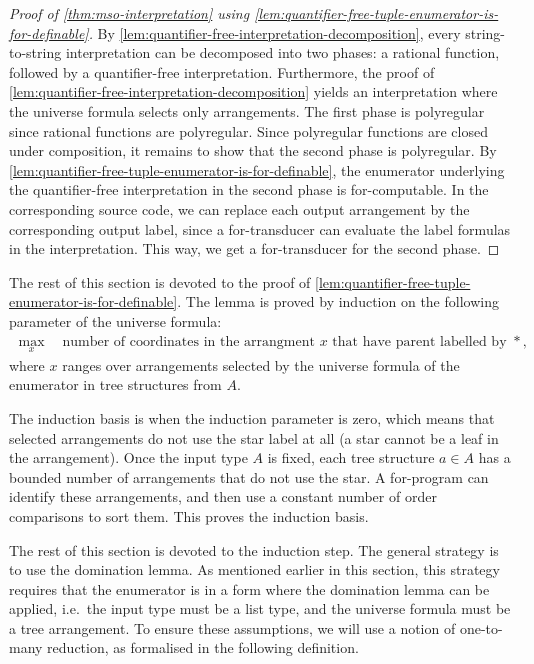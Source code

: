 \begin{proof}[Proof of \cref{thm:mso-interpretation} using \cref{lem:quantifier-free-tuple-enumerator-is-for-definable}]
By  \cref{lem:quantifier-free-interpretation-decomposition}, every string-to-string \mso interpretation can be decomposed into two phases:  a rational function, followed by  a quantifier-free interpretation. Furthermore, the proof of \cref{lem:quantifier-free-interpretation-decomposition} yields an  interpretation where the universe formula selects only arrangements. The first phase is polyregular since rational functions are polyregular. Since polyregular functions are closed under composition, it remains to show that the  second phase is polyregular. By \cref{lem:quantifier-free-tuple-enumerator-is-for-definable}, the  enumerator  underlying the quantifier-free interpretation in the second phase is for-computable. In the corresponding source code, we can replace each output arrangement by the corresponding output label, since a for-transducer can evaluate the label formulas in the interpretation. This way, we get a for-transducer for the second phase.
\end{proof}

The rest of this section is devoted to the proof of \cref{lem:quantifier-free-tuple-enumerator-is-for-definable}.  The lemma is proved by induction on the following parameter of the universe formula:
\begin{align*}
\max_x \quad  \text{number of coordinates in the arrangment $x$ that have parent labelled by $*$},
\end{align*}
where $x$ ranges over arrangements selected by the universe formula of the enumerator in tree structures from $A$.

The induction basis is when the induction parameter is zero, which means that selected arrangements do not use the star label at all (a star cannot be a leaf in the arrangement).  Once the input type $A$ is fixed, each tree structure $a \in A$ has a bounded number of arrangements that do not use the star. A for-program can identify these arrangements, and then use a constant number of order comparisons to sort them. This proves the induction basis.

The rest of this section is devoted to the induction step. The general strategy is to  use the domination lemma. As mentioned earlier in this section, this strategy requires that the enumerator is in  a form where the domination lemma can be applied, i.e.~the input type must be a list type, and the universe formula must be a tree arrangement. To ensure these assumptions, we will use a notion of one-to-many reduction, as formalised in the following definition.




